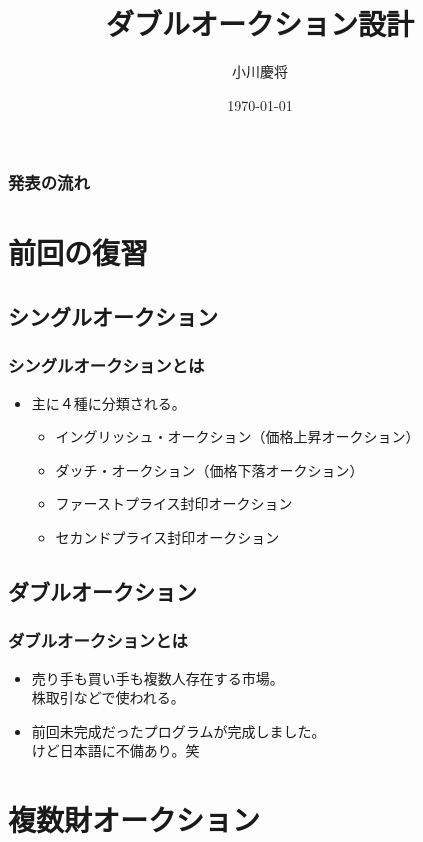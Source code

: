 \documentclass[dvipdfmx,12pt]{beamer}
\title{ダブルオークション設計}
\author{小川慶将}
\date{\today}
\begin{document}
\begin{frame}\frametitle{}
 \titlepage
\end{frame}

\begin{frame}\frametitle{発表の流れ}
 \tableofcontents
\end{frame}

\section{前回の復習}
\subsection{シングルオークション}
\begin{frame}
\frametitle{シングルオークションとは}
\begin{itemize}\setlength{\parskip}{0.5em}
\item
主に４種に分類される。
\begin{itemize}\setlength{\parskip}{0.5em}
\item
イングリッシュ・オークション（価格上昇オークション）
\item
ダッチ・オークション（価格下落オークション）
\item
ファーストプライス封印オークション
\item
セカンドプライス封印オークション
\end{itemize}
\end{itemize}
\end{frame}


\subsection{ダブルオークション}
\begin{frame}
\frametitle{ダブルオークションとは}
\begin{itemize}\setlength{\parskip}{0.5em}
\item
売り手も買い手も複数人存在する市場。\\
株取引などで使われる。\pause
\item
前回未完成だったプログラムが完成しました。\\
けど日本語に不備あり。笑
\end{itemize}
\end{frame}

\section{複数財オークション}
\end{document}
